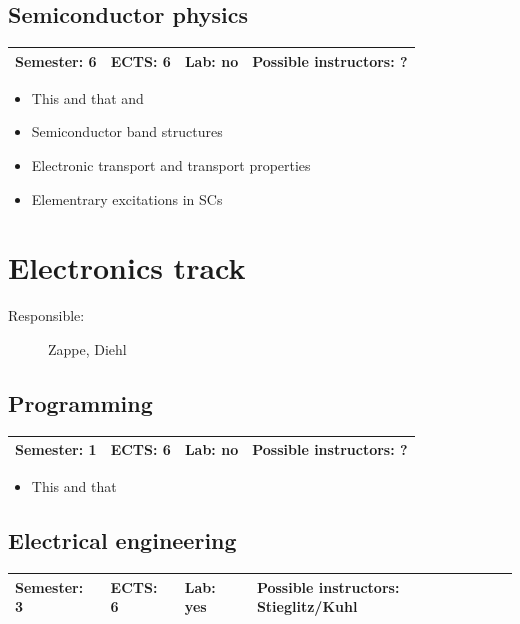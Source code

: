 \documentclass[12pt,twoside,fleqn,a4paper]{article}
\begin{document}
\subsection{Semiconductor physics}
\begin{tabular}{llll} \hline
\textbf{Semester:} 6 & \textbf{ECTS:} 6 & \textbf{Lab:} no & \textbf{Possible instructors:} ?\\
\hline
\end{tabular}

\begin{itemize}
\setlength\itemsep{0cm}
\item This and that and
\item Semiconductor band structures
\item Electronic transport and transport properties
\item Elementrary excitations in SCs

\end{itemize}


\newpage
\section{Electronics track}
\begin{description}
\item[Responsible:] Zappe, Diehl
\end{description}
\vspace{1 mm}


\subsection{Programming}
\begin{tabular}{llll} \hline
\textbf{Semester:} 1 & \textbf{ECTS:} 6 & \textbf{Lab:} no & \textbf{Possible instructors:} ?\\
\hline
\end{tabular}

\begin{itemize}
\setlength\itemsep{0cm}
\item This and that
\end{itemize}


\subsection{Electrical engineering}
\begin{tabular}{llll} \hline
\textbf{Semester:} 3 & \textbf{ECTS:} 6 & \textbf{Lab:} yes & \textbf{Possible instructors:} Stieglitz/Kuhl\\
\hline
\end{tabular}
\end{document}
